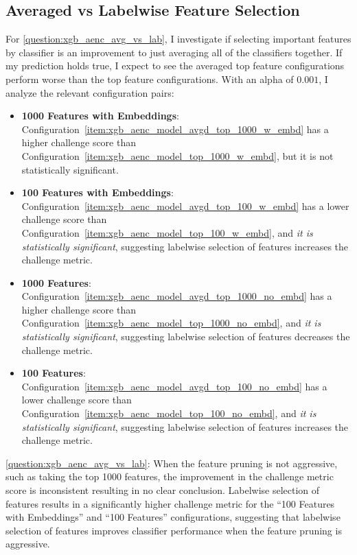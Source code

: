 \documentclass[\main/thesis.tex]{subfiles}
\begin{document}
\subsection{Averaged vs Labelwise Feature Selection}
For \ref{question:xgb_aenc_avg_vs_lab}, I investigate if selecting important features by classifier is an improvement to just averaging all of the classifiers together.
If my prediction holds true, I expect to see the averaged top feature configurations perform worse than the top feature configurations.
With an alpha of $0.001$, I analyze the relevant configuration pairs:
\begin{itemize}
    \item \textbf{1000 Features with Embeddings}: Configuration~\ref{item:xgb_aenc_model_avgd_top_1000_w_embd} has a higher challenge score than Configuration~\ref{item:xgb_aenc_model_top_1000_w_embd}, but it is not statistically significant.
    \item \textbf{100 Features with Embeddings}: Configuration~\ref{item:xgb_aenc_model_avgd_top_100_w_embd} has a lower challenge score than Configuration~\ref{item:xgb_aenc_model_top_100_w_embd}, and \emph{it is statistically significant}, suggesting labelwise selection of features increases the challenge metric.
    \item \textbf{1000 Features}: Configuration~\ref{item:xgb_aenc_model_avgd_top_1000_no_embd} has a higher challenge score than Configuration~\ref{item:xgb_aenc_model_top_1000_no_embd}, and \emph{it is statistically significant}, suggesting labelwise selection of features decreases the challenge metric.
    \item \textbf{100 Features}: Configuration~\ref{item:xgb_aenc_model_avgd_top_100_no_embd} has a lower challenge score than Configuration~\ref{item:xgb_aenc_model_top_100_no_embd}, and \emph{it is statistically significant}, suggesting labelwise selection of features increases the challenge metric.
\end{itemize}

\ref{question:xgb_aenc_avg_vs_lab}: When the feature pruning is not aggressive, such as taking the top 1000 features, the improvement in the challenge metric score is inconsistent resulting in no clear conclusion.
Labelwise selection of features results in a significantly higher challenge metric for the ``100 Features with Embeddings'' and ``100 Features'' configurations, suggesting that labelwise selection of features improves classifier performance when the feature pruning is aggressive.
\end{document}
